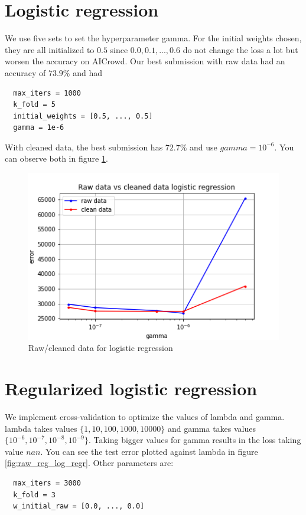 \documentclass[11pt, a4paper, twocolumn]{article}
\begin{document}
\section{Logistic regression}
We use five sets to set the hyperparameter gamma.
For the initial weights chosen, they are all initialized to $0.5$ since $0.0, 0.1, ..., 0.6$ do not change the loss a lot but worsen the accuracy on AICrowd.
Our best submission with raw data had an accuracy of $73.9\%$ and had 
\begin{lstlisting}
  max_iters = 1000
  k_fold = 5
  initial_weights = [0.5, ..., 0.5]
  gamma = 1e-6
\end{lstlisting}
With cleaned data, the best submission has $72.7\%$ and use $gamma = 10^{-6}$.
You can observe both in figure \ref{fig:raw_clean_log_reg}.

\begin{figure}[h!]
  \includegraphics[width=\linewidth]{raw_vs_clean_log_reg.png}
  \caption{Raw/cleaned data for logistic regression}
  \label{fig:raw_clean_log_reg}
\end{figure}

\newpage
\section{Regularized logistic regression}
We implement cross-validation to optimize the values of lambda and gamma. lambda takes values
$\{1,10,100,1000,10000\}$ and gamma takes values $\{10^{-6},10^{-7},10^{-8},10^{-9}\}$. Taking bigger
values for gamma results in the loss taking value $nan$. You can see the test error plotted against lambda in figure \ref{fig:raw_reg_log_regr}. Other parameters are: 
\begin{lstlisting}
  max_iters = 3000
  k_fold = 3
  w_initial_raw = [0.0, ..., 0.0]
\end{lstlisting}
\end{document}
